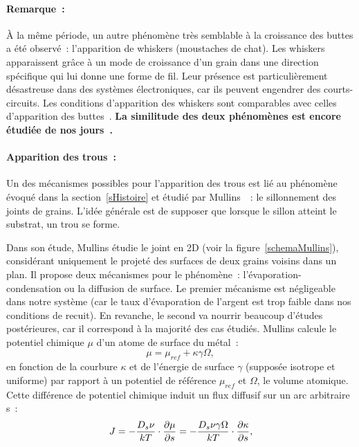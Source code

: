 \paragraph*{Remarque~:} À la même période, un autre phénomène très semblable à la croissance des buttes a été observé~: l'apparition de whiskers (moustaches de chat). Les whiskers apparaissent grâce à un mode de croissance d'un grain dans une direction spécifique qui lui donne une forme de fil. Leur présence est particulièrement désastreuse dans des systèmes électroniques, car ils peuvent engendrer des courts-circuits. Les conditions d'apparition des whiskers sont comparables avec celles d'apparition des buttes~\cite{rhead1963surface}. \textbf{La similitude des deux phénomènes est encore étudiée de nos jours~\cite{sarobol2013whisker}.}

\paragraph*{Apparition des trous~:} Un des mécanismes possibles pour l'apparition des trous est lié au phénomène évoqué dans la section~\ref{sHistoire} et étudié par Mullins~\cite{mullins1957theory}~: le sillonnement des joints de grains. L'idée générale est de supposer que lorsque le sillon atteint le substrat, un trou se forme.\par 
Dans son étude, Mullins étudie le joint en 2D (voir la figure~\ref{schemaMullins}), considérant uniquement le projeté des surfaces de deux grains voisins dans un plan. Il propose deux mécanismes pour le phénomène~: l'évaporation-condensation ou la diffusion de surface. Le premier mécanisme est négligeable dans notre système (car le taux d'évaporation de l'argent est trop faible dans nos conditions de recuit). En revanche, le second va nourrir beaucoup d'études postérieures, car il correspond à la majorité des cas étudiés. Mullins calcule le potentiel chimique $\mu$ d'un atome de surface du métal~: 
\begin{equation}
\mu = \mu_{ref} + \kappa \gamma \Omega,
\end{equation}
en fonction de la courbure $\kappa$ et de l'énergie de surface $\gamma$ (supposée isotrope et uniforme) par rapport à un potentiel de référence $\mu_{ref}$ et $\Omega$, le volume atomique. Cette différence de potentiel chimique induit un flux diffusif sur un arc arbitraire s~:
\begin{equation}
J = -\dfrac{D_s\nu}{kT}\cdot\dfrac{\partial\mu}{\partial s}\newline
 = -\dfrac{D_s\nu\gamma\Omega}{kT}\cdot\dfrac{\partial\kappa}{\partial s},
\label{eDiffFlux}
\end{equation}
